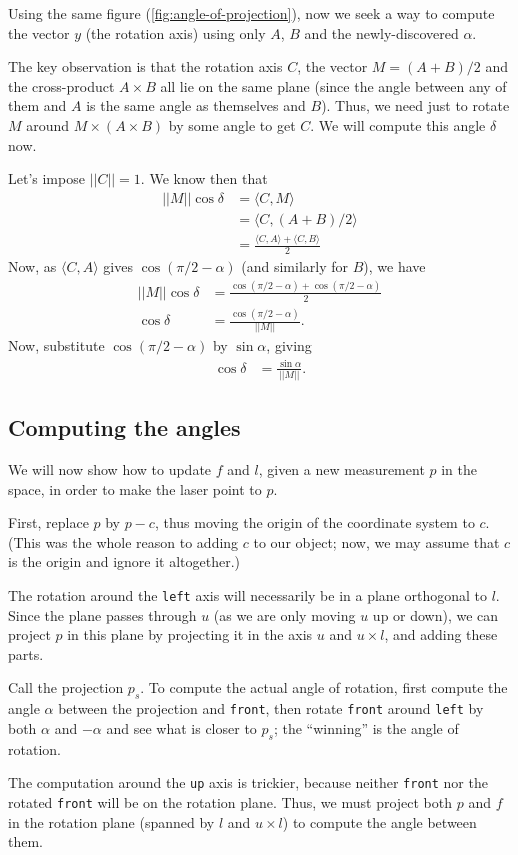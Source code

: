 \documentclass{article}
\begin{document}
Using the same figure (\ref{fig:angle-of-projection}),
now we seek a way to compute the vector $y$
(the rotation axis)
using only $A$, $B$ and the newly-discovered $\alpha$.

The key observation is that the rotation axis $C$,
the vector $M = (A + B)/2$ and the cross-product $A \times B$
all lie on the same plane
(since the angle between any of them and $A$ is the same angle as
themselves and $B$).
Thus, we need just to rotate $M$ around $M \times (A \times B)$
by some angle to get $C$.
We will compute this angle $\delta$ now.

Let's impose $||C|| = 1$.
We know then that
\begin{align*}
    ||M|| \cos \delta &= \langle C, M \rangle \\
                      &= \langle C, (A + B) / 2 \rangle \\
                      &= \frac{ \langle C, A \rangle + \langle C, B \rangle }{2}
\end{align*}
Now, as $\langle C, A \rangle$ gives $\cos( \pi/2 - \alpha )$
(and similarly for $B$),
we have
\begin{align*}
    ||M|| \cos \delta &= \frac{ \cos(\pi/2 - \alpha) + \cos(\pi/2 - \alpha)}{2} \\
    \cos \delta &= \frac{\cos(\pi/2 - \alpha)}{||M||}.
\end{align*}
Now, substitute $\cos(\pi/2 - \alpha)$ by $\sin \alpha$, giving
\begin{align*}
    \cos \delta &= \frac{\sin \alpha}{||M||}.
\end{align*}

\subsection{Computing the angles}

We will now show how to update $f$ and $l$,
given a new measurement $p$ in the space,
in order to make the laser point to $p$.

First, replace $p$ by $p - c$,
thus moving the origin of the coordinate system to $c$.
(This was the whole reason to adding $c$ to our object;
now, we may assume that $c$ is the origin and ignore it altogether.)

The rotation around the \texttt{left} axis
will necessarily be in a plane orthogonal to $l$.
Since the plane passes through $u$
(as we are only moving $u$ up or down),
we can project $p$ in this plane
by projecting it in the axis $u$ and $u \times l$,
and adding these parts.

Call the projection $p_s$.
To compute the actual angle of rotation,
first compute the angle $\alpha$ between the projection and \texttt{front},
then rotate \texttt{front} around \texttt{left} by both $\alpha$ and $-\alpha$
and see what is closer to $p_s$;
the ``winning'' is the angle of rotation.

The computation around the \texttt{up} axis is trickier,
because neither \texttt{front} nor the rotated \texttt{front}
will be on the rotation plane.
Thus, we must project both $p$ and $f$ in the rotation plane
(spanned by $l$ and $u \times l$)
to compute the angle between them.
\end{document}
